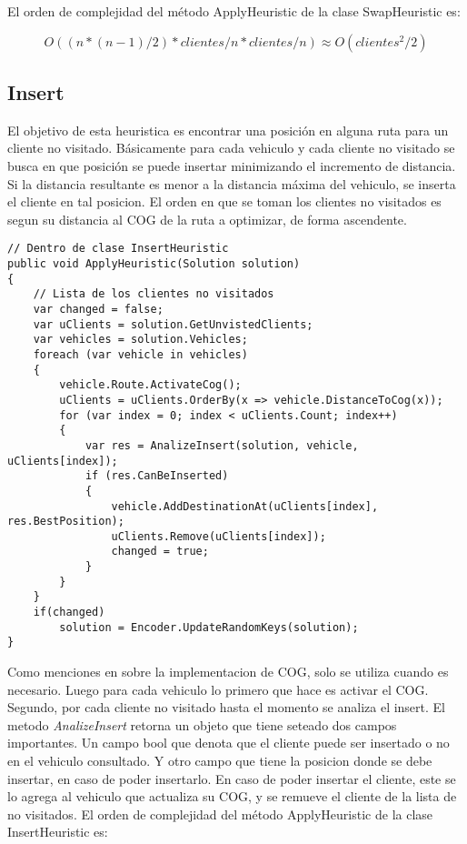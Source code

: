 \bigskip

El orden de complejidad del método ApplyHeuristic de la clase SwapHeuristic es:

\begin{equation*}
O((n * (n-1) / 2 ) * clientes/n * clientes/n) \approx O(clientes^2/2)
\end{equation*}

\subsection{Insert}

El objetivo de esta heuristica es encontrar una posición en alguna ruta para un cliente no visitado. Básicamente para cada vehiculo y cada cliente no visitado se busca en que posición se puede insertar minimizando el incremento de distancia. Si la distancia resultante es menor a la distancia máxima del vehiculo, se inserta el cliente en tal posicion. El orden en que se toman los clientes no visitados es segun su distancia al COG de la ruta a optimizar, de forma ascendente.

\begin{minipage}{\textwidth}
\begin{lstlisting}
// Dentro de clase InsertHeuristic
public void ApplyHeuristic(Solution solution)
{
	// Lista de los clientes no visitados
	var changed = false;	
	var uClients = solution.GetUnvistedClients;	
	var vehicles = solution.Vehicles;
	foreach (var vehicle in vehicles)
	{
		vehicle.Route.ActivateCog();
		uClients = uClients.OrderBy(x => vehicle.DistanceToCog(x));	
		for (var index = 0; index < uClients.Count; index++)
		{
			var res = AnalizeInsert(solution, vehicle, uClients[index]);
			if (res.CanBeInserted)
			{
				vehicle.AddDestinationAt(uClients[index], res.BestPosition);
				uClients.Remove(uClients[index]);
				changed = true;
			}
		}
	}
	if(changed)
		solution = Encoder.UpdateRandomKeys(solution);
}
\end{lstlisting}
\end{minipage}

\bigskip

Como menciones en sobre la implementacion de COG, solo se utiliza cuando es necesario. Luego para cada vehiculo lo primero que hace es activar el COG. Segundo, por cada cliente no visitado hasta el momento se analiza el insert. El metodo \textit{AnalizeInsert} retorna un objeto que tiene seteado dos campos importantes. Un campo bool que denota que el cliente puede ser insertado o no en el vehiculo consultado. Y otro campo que tiene la posicion donde se debe insertar, en caso de poder insertarlo. En caso de poder insertar el cliente, este se lo agrega al vehiculo que actualiza su COG, y se remueve el cliente de la lista de no visitados. El orden de complejidad del método ApplyHeuristic de la clase InsertHeuristic es: 


